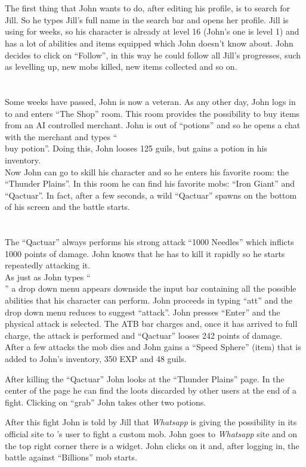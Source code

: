 	\section{\scenarioFellowship}
		The first thing that John wants to do, after editing his profile, is to search for Jill. So he types Jill's full name in the search bar and opens her profile. Jill is using \SocialBattle{} for weeks, so his character is already at level 16 (John's one is level 1) and has a lot of abilities and items equipped which John doesn't know about. John decides to click on ``Follow'', in this way he could follow all Jill's progresses, such as levelling up, new mobs killed, new items collected and so on.

	\section{\scenarioRooms}
		Some weeks have passed, John is now a veteran. As any other day, John logs in to \SocialBattle{} and enters ``The Shop'' room. This room provides the possibility to buy items from an AI controlled merchant. John is out of ``potions'' and so he opens a chat with the merchant and types ``\\buy potion''. Doing this, John looses 125 guils, but gains a potion in his inventory.\\
		Now John can go to skill his character and so he enters his favorite room: the ``Thunder Plains''. In this room he can find his favorite mobs: ``Iron Giant'' and ``Qactuar''. In fact, after a few seconds, a wild ``Qactuar'' spawns on the bottom of his screen and the battle starts.

	\section{\scenarioBattle}
		The ``Qactuar'' always performs his strong attack ``1000 Needles'' which inflicts 1000 points of damage. John knows that he has to kill it rapidly so he starts repeatedly attacking it.\\
		As just as John types ``\\'' a drop down menu appears downside the input bar containing all the possible abilities that his character can perform. John proceeds in typing ``att'' and the drop down menu reduces to suggest ``attack''. John presses ``Enter'' and the physical attack is selected. The ATB bar charges and, once it has arrived to full charge, the attack is performed and ``Qactuar'' looses 242 points of damage.\\
		After a few attacks the mob dies and John gains a ``Speed Sphere'' (item) that is added to John's inventory, 350 EXP and 48 guils.

		After killing the ``Qactuar'' John looks at the ``Thunder Plains'' page. In the center of the page he can find the loots discarded by other users at the end of a fight. Clicking on ``grab'' John takes other two potions.

		After this fight John is told by Jill that \textit{Whatsapp} is giving the possibility in its official site to \SocialBattle{}'s user to fight a custom mob. John goes to \textit{Whatsapp} site and on the top right corner there is a widget. John clicks on it and, after logging in, the battle against ``Billions'' mob starts.
	
